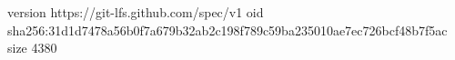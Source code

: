 version https://git-lfs.github.com/spec/v1
oid sha256:31d1d7478a56b0f7a679b32ab2c198f789c59ba235010ae7ec726bcf48b7f5ac
size 4380
